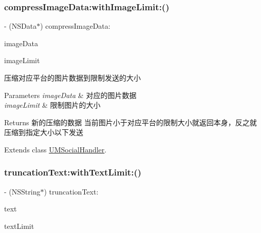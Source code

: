 \subsubsection{\texorpdfstring{compress\+Image\+Data\+:with\+Image\+Limit\+:()}{compressImageData:withImageLimit:()}\hspace{0.1cm}{\footnotesize\ttfamily [2/2]}}
{\footnotesize\ttfamily -\/ (N\+S\+Data$\ast$) compress\+Image\+Data\+: \begin{DoxyParamCaption}\item[{(N\+S\+Data $\ast$)}]{image\+Data }\item[{withImageLimit:(N\+S\+U\+Integer)}]{image\+Limit }\end{DoxyParamCaption}}

压缩对应平台的图片数据到限制发送的大小


\begin{DoxyParams}{Parameters}
{\em image\+Data} & 对应的图片数据 \\
\hline
{\em image\+Limit} & 限制图片的大小\\
\hline
\end{DoxyParams}
\begin{DoxyReturn}{Returns}
新的压缩的数据  当前图片小于对应平台的限制大小就返回本身，反之就压缩到指定大小以下发送 
\end{DoxyReturn}


Extends class \mbox{\hyperlink{interface_u_m_social_handler_a240f1107abc2ef1e2d139535551a4f36}{U\+M\+Social\+Handler}}.

\mbox{\label{category_u_m_social_handler_07_u_m_social_limit_08_ae19a28003b6af6039dc68c0b465386c0}} 
\subsubsection{\texorpdfstring{truncation\+Text\+:with\+Text\+Limit\+:()}{truncationText:withTextLimit:()}\hspace{0.1cm}{\footnotesize\ttfamily [1/2]}}
{\footnotesize\ttfamily -\/ (N\+S\+String$\ast$) truncation\+Text\+: \begin{DoxyParamCaption}\item[{(N\+S\+String $\ast$)}]{text }\item[{withTextLimit:(N\+S\+U\+Integer)}]{text\+Limit }\end{DoxyParamCaption}}


